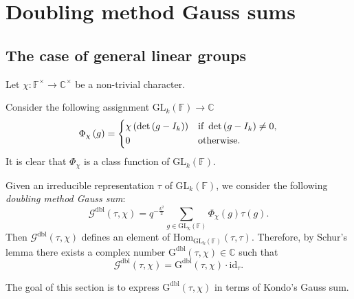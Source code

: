 \documentclass[12pt, reqno]{amsart}
\theoremstyle{definition}
\theoremstyle{definition}
\theoremstyle{definition}
\newcommand{\cComplex}{\mathbb{C}}
\newcommand{\multiplicativegroup}[1]{#1^{\times}}
\newcommand{\Hom}{\mathrm{Hom}}
\newcommand{\idmap}{\mathrm{id}}
\newcommand{\IdentityMatrix}[1]{I_{#1}}
\newcommand{\GL}{\mathrm{GL}}
\newcommand{\finiteField}{\mathbb{F}}
\newcommand{\dblGaussSum}[2]{\mathcal{G}^{\mathrm{dbl}}\left(#1, #2\right)}
\newcommand{\dblGaussSumScalar}[2]{\mathrm{G}^{\mathrm{dbl}}\left(#1, #2\right)}
\begin{document}
\section{Doubling method Gauss sums}

\subsection{The case of general linear groups}

Let $\chi \colon \multiplicativegroup{\finiteField} \to \multiplicativegroup{\cComplex}$ be a non-trivial character.

Consider the following assignment $\GL_k\left(\finiteField\right) \to \cComplex$
$$\Phi_{\chi}\left(g\right) = \begin{dcases}
	\chi\left(\det\left(g-\IdentityMatrix{k}\right)\right) & \text{if }\det\left(g-\IdentityMatrix{k}\right) \ne 0,\\
	0 & \text{otherwise.}
\end{dcases}$$
It is clear that $\Phi_{\chi}$ is a class function of $\GL_k\left(\finiteField\right)$.

Given an irreducible representation $\tau$ of $\GL_k\left(\finiteField\right)$, we consider the following \emph{doubling method Gauss sum}:
$$\dblGaussSum{\tau}{\chi} = q^{-\frac{k^2}{2}} \sum_{g \in \GL_k\left(\finiteField\right)} \Phi_{\chi}\left(g\right) \tau\left(g\right).$$
Then $\dblGaussSum{\tau}{\chi}$ defines an element of $\Hom_{\GL_k\left(\finiteField\right)}\left(\tau, \tau\right)$. Therefore, by Schur's lemma there exists a complex number $\dblGaussSumScalar{\tau}{\chi} \in \cComplex$ such that $$\dblGaussSum{\tau}{\chi} = \dblGaussSumScalar{\tau}{\chi} \cdot \idmap_\tau.$$ 

The goal of this section is to express $\dblGaussSumScalar{\tau}{\chi}$ in terms of Kondo's Gauss sum.
\end{document}
